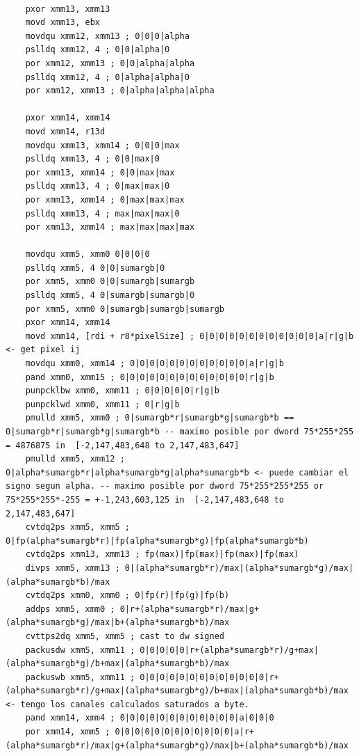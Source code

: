 \begin{codesnippet}
\begin{verbatim}

	pxor xmm13, xmm13
	movd xmm13, ebx
	movdqu xmm12, xmm13 ; 0|0|0|alpha
	pslldq xmm12, 4 ; 0|0|alpha|0
	por xmm12, xmm13 ; 0|0|alpha|alpha
	pslldq xmm12, 4 ; 0|alpha|alpha|0
	por xmm12, xmm13 ; 0|alpha|alpha|alpha

	pxor xmm14, xmm14
	movd xmm14, r13d
	movdqu xmm13, xmm14 ; 0|0|0|max
	pslldq xmm13, 4 ; 0|0|max|0
	por xmm13, xmm14 ; 0|0|max|max
	pslldq xmm13, 4 ; 0|max|max|0
	por xmm13, xmm14 ; 0|max|max|max
	pslldq xmm13, 4 ; max|max|max|0
	por xmm13, xmm14 ; max|max|max|max

	movdqu xmm5, xmm0 0|0|0|0
	pslldq xmm5, 4 0|0|sumargb|0
	por xmm5, xmm0 0|0|sumargb|sumargb
	pslldq xmm5, 4 0|sumargb|sumargb|0
	por xmm5, xmm0 0|sumargb|sumargb|sumargb
	pxor xmm14, xmm14
	movd xmm14, [rdi + r8*pixelSize] ; 0|0|0|0|0|0|0|0|0|0|0|0|a|r|g|b <- get pixel ij
	movdqu xmm0, xmm14 ; 0|0|0|0|0|0|0|0|0|0|0|0|a|r|g|b
	pand xmm0, xmm15 ; 0|0|0|0|0|0|0|0|0|0|0|0|0|r|g|b
	punpcklbw xmm0, xmm11 ; 0|0|0|0|0|r|g|b
	punpcklwd xmm0, xmm11 ; 0|r|g|b
	pmulld xmm5, xmm0 ; 0|sumargb*r|sumargb*g|sumargb*b == 0|sumargb*r|sumargb*g|sumargb*b -- maximo posible por dword 75*255*255 = 4876875 in  [-2,147,483,648 to 2,147,483,647]
	pmulld xmm5, xmm12 ; 0|alpha*sumargb*r|alpha*sumargb*g|alpha*sumargb*b <- puede cambiar el signo segun alpha. -- maximo posible por dword 75*255*255*255 or 75*255*255*-255 = +-1,243,603,125 in  [-2,147,483,648 to 2,147,483,647]
    cvtdq2ps xmm5, xmm5 ; 0|fp(alpha*sumargb*r)|fp(alpha*sumargb*g)|fp(alpha*sumargb*b)
	cvtdq2ps xmm13, xmm13 ; fp(max)|fp(max)|fp(max)|fp(max)
	divps xmm5, xmm13 ; 0|(alpha*sumargb*r)/max|(alpha*sumargb*g)/max|(alpha*sumargb*b)/max
	cvtdq2ps xmm0, xmm0 ; 0|fp(r)|fp(g)|fp(b)
	addps xmm5, xmm0 ; 0|r+(alpha*sumargb*r)/max|g+(alpha*sumargb*g)/max|b+(alpha*sumargb*b)/max
	cvttps2dq xmm5, xmm5 ; cast to dw signed 
	packusdw xmm5, xmm11 ; 0|0|0|0|0|r+(alpha*sumargb*r)/g+max|(alpha*sumargb*g)/b+max|(alpha*sumargb*b)/max
	packuswb xmm5, xmm11 ; 0|0|0|0|0|0|0|0|0|0|0|0|0|r+(alpha*sumargb*r)/g+max|(alpha*sumargb*g)/b+max|(alpha*sumargb*b)/max <- tengo los canales calculados saturados a byte.
	pand xmm14, xmm4 ; 0|0|0|0|0|0|0|0|0|0|0|0|a|0|0|0
	por xmm14, xmm5 ; 0|0|0|0|0|0|0|0|0|0|0|0|a|r+(alpha*sumargb*r)/max|g+(alpha*sumargb*g)/max|b+(alpha*sumargb*b)/max
	
\end{verbatim}
\end{codesnippet}

